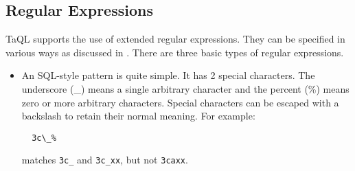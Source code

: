 \subsection{\label{TAQL:REGEX}Regular Expressions}
TaQL supports the use of extended regular expressions. They can be
specified in various ways as discussed in .
There are three basic types of regular expressions.
\begin{itemize}
\item An SQL-style pattern is quite simple. It has 2 special
  characters. The underscore (\_) means a single arbitrary character
  and the percent (\%) means zero or more arbitrary characters.
  Special characters can be escaped with a backslash to retain their
  normal meaning.
  For example:
\begin{verbatim}
  3c\_%
\end{verbatim}
matches \texttt{3c\_} and \texttt{3c\_xx}, but not \texttt{3caxx}.


\end{itemize}
